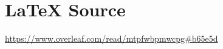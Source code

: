 \documentclass{article}
\theoremstyle{definition}
\begin{document}
\section*{\LaTeX \hspace{0.025 mm} Source}
\url{https://www.overleaf.com/read/mtpfwbpmwcpg#b65e5d}
%
%
%


%
%
%
%
%
\end{document}
